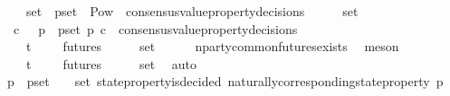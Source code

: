 \begin{isabellebody}
\ \ \ {\isachardoublequoteopen}{\isasymsigma}\ {\isasymin}\ {\isasymsigma}{\isacharunderscore}set\ {\isasymand}\ p{\isacharunderscore}set\ {\isasymin}\ Pow\ {\isacharparenleft}{\isasymUnion}\ {\isacharbraceleft}consensus{\isacharunderscore}value{\isacharunderscore}property{\isacharunderscore}decisions\ {\isasymsigma}{\isacharprime}\ {\isacharbar}\ {\isasymsigma}{\isacharprime}{\isachardot}\ {\isasymsigma}{\isacharprime}\ {\isasymin}\ {\isasymsigma}{\isacharunderscore}set{\isacharbraceright}{\isacharparenright}\ {\isacharminus}\ {\isasymemptyset}{\isachardoublequoteclose}\isanewline
\ \ \ {\isachardoublequoteopen}{\isacharparenleft}{\isasymlambda}c{\isachardot}\ {\isasymnot}\ {\isacharparenleft}{\isasymforall}\ p\ {\isasymin}\ p{\isacharunderscore}set{\isachardot}\ p\ c{\isacharparenright}{\isacharparenright}\ {\isasymin}\ consensus{\isacharunderscore}value{\isacharunderscore}property{\isacharunderscore}decisions\ {\isasymsigma}{\isachardoublequoteclose}\isanewline
\ \ \isamarkupfalse%
\ {\isachardoublequoteopen}{\isasymexists}\ {\isasymsigma}{\isachardot}\ {\isasymsigma}\ {\isasymin}\ {\isasymSigma}t\ {\isasymand}\ {\isasymsigma}\ {\isasymin}\ {\isasymInter}\ {\isacharbraceleft}futures\ {\isasymsigma}\ {\isacharbar}\ {\isasymsigma}{\isachardot}\ {\isasymsigma}\ {\isasymin}\ {\isasymsigma}{\isacharunderscore}set{\isacharbraceright}{\isachardoublequoteclose}\isanewline
\ \ \ \ \isamarkupfalse%
\ n{\isacharunderscore}party{\isacharunderscore}common{\isacharunderscore}futures{\isacharunderscore}exists\ \isamarkupfalse%
\ meson\isanewline
\ \ \isamarkupfalse%
\ \isamarkupfalse%
\ {\isasymsigma}{\isacharprime}\ \ {\isachardoublequoteopen}{\isasymsigma}{\isacharprime}\ {\isasymin}\ {\isasymSigma}t\ {\isasymand}\ {\isasymsigma}{\isacharprime}\ {\isasymin}\ {\isasymInter}\ {\isacharbraceleft}futures\ {\isasymsigma}\ {\isacharbar}\ {\isasymsigma}{\isachardot}\ {\isasymsigma}\ {\isasymin}\ {\isasymsigma}{\isacharunderscore}set{\isacharbraceright}{\isachardoublequoteclose}\ \isamarkupfalse%
\ auto\isanewline
\ \ \isamarkupfalse%
\ {\isachardoublequoteopen}{\isasymforall}\ p\ {\isasymin}\ p{\isacharunderscore}set{\isachardot}\ {\isasymexists}\ {\isasymsigma}{\isacharprime}{\isacharprime}\ {\isasymin}\ {\isasymsigma}{\isacharunderscore}set{\isachardot}\ state{\isacharunderscore}property{\isacharunderscore}is{\isacharunderscore}decided\ {\isacharparenleft}naturally{\isacharunderscore}corresponding{\isacharunderscore}state{\isacharunderscore}property\ p{\isacharcomma}\ {\isasymsigma}{\isacharprime}{\isacharprime}{\isacharparenright}{\isachardoublequoteclose}\isanewline

\end{isabellebody}
